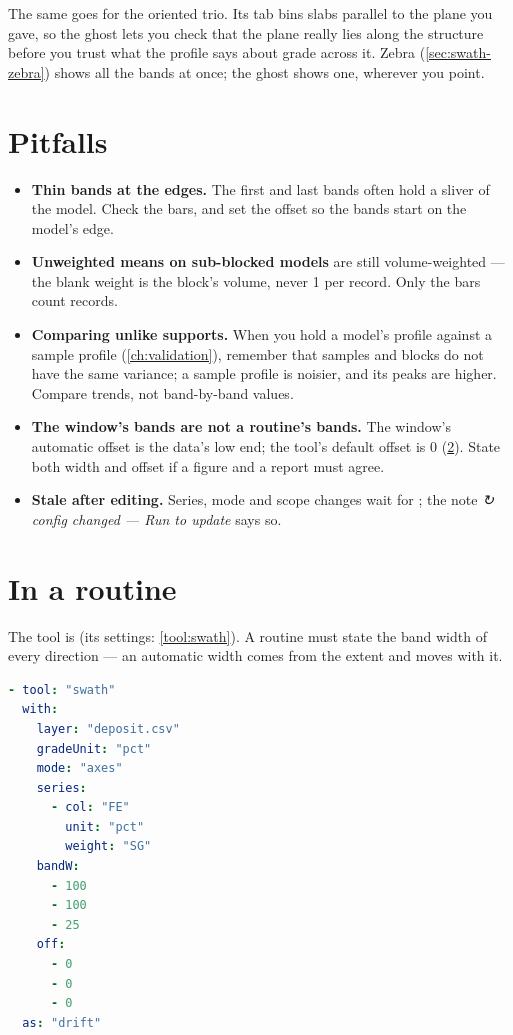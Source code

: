 The same goes for the oriented trio. Its  tab bins slabs parallel to the plane you gave, so the ghost lets you check that the plane really lies along the structure before you trust what the profile says about grade across it. Zebra (\cref{sec:swath-zebra}) shows all the bands at once; the ghost shows one, wherever you point.

\section{Pitfalls}\label{sec:swath-pitfalls}
\begin{itemize}
\item \textbf{Thin bands at the edges.} The first and last bands often hold a sliver of the model. Check the bars, and set the offset so the bands start on the model's edge.
\item \textbf{Unweighted means on sub-blocked models} are still volume-weighted — the blank weight is the block's volume, never 1 per record. Only the  bars count records.
\item \textbf{Comparing unlike supports.} When you hold a model's profile against a sample profile (\cref{ch:validation}), remember that samples and blocks do not have the same variance; a sample profile is noisier, and its peaks are higher. Compare trends, not band-by-band values.
\item \textbf{The window's bands are not a routine's bands.} The window's automatic offset is the data's low end; the tool's default offset is 0 (\cref{sec:swath-routine}). State both width and offset if a figure and a report must agree.
\item \textbf{Stale after editing.} Series, mode and scope changes wait for ; the note \emph{↻ config changed — Run to update} says so.
\end{itemize}

\section{In a routine}\label{sec:swath-routine}
The tool is  (its settings: \cref{tool:swath}). A routine must state the band width of every direction — an automatic width comes from the extent and moves with it.

\begin{lstlisting}[language=yaml]
- tool: "swath"
  with:
    layer: "deposit.csv"
    gradeUnit: "pct"
    mode: "axes"
    series:
      - col: "FE"
        unit: "pct"
        weight: "SG"
    bandW:
      - 100
      - 100
      - 25
    off:
      - 0
      - 0
      - 0
  as: "drift"
\end{lstlisting}

